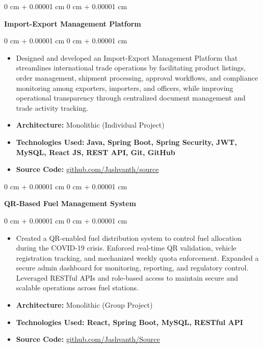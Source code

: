 \documentclass[10pt, letterpaper]{article}
\newenvironment{highlights}{
    \begin{itemize}[
        topsep=0.08 cm,
        parsep=0.08 cm,
        partopsep=0pt,
        itemsep=0pt,
        leftmargin=0 cm + 10pt
    ]
}{
    \end{itemize}
} %
\newenvironment{onecolentry}{
    \begin{adjustwidth}{
        0 cm + 0.00001 cm
    }{
        0 cm + 0.00001 cm
    }
}{
    \end{adjustwidth}
} %
\begin{document}
    \vspace{0.10 cm}

    \begin{onecolentry}
        \textbf{Import-Export Management Platform}
    \end{onecolentry}

    \vspace{0.10 cm}
    \begin{onecolentry}
        \begin{highlights}
            \item Designed and developed an Import-Export Management Platform that streamlines international trade operations by facilitating product listings, order management, shipment processing, approval workflows, and compliance monitoring among exporters, importers, and officers, while improving operational transparency through centralized document management and trade activity tracking.
            \item \textbf{Architecture:} Monolithic (Individual Project)
            \item \textbf{Technologies Used:} \textbf{Java, Spring Boot, Spring Security, JWT, MySQL, React JS, REST API, Git, GitHub}
            \item \textbf{Source Code:} \href{https://github.com/jashvanth370/Import-Export-Products-Project}{github.com/Jashvanth/source}
        \end{highlights}
    \end{onecolentry}

    \vspace{0.10 cm}

    \begin{onecolentry}
        \textbf{QR-Based Fuel Management System}
    \end{onecolentry}
    
    \vspace{0.10 cm}
    \begin{onecolentry}
        \begin{highlights}
            \item Created a QR-enabled fuel distribution system to control fuel allocation during the COVID-19 crisis. Enforced real-time QR validation, vehicle registration tracking, and mechanized weekly quota enforcement. Expanded a secure admin dashboard for monitoring, reporting, and regulatory control. Leveraged RESTful APIs and role-based access to maintain secure and scalable operations across fuel stations.
            \item \textbf{Architecture:} Monolithic (Group Project)
            \item \textbf{Technologies Used: React, Spring Boot, MySQL, RESTful API}
            \item \textbf{Source Code:} \href{https://github.com/Kirisi15/Fuel_Station}{github.com/Jashvanth/Source}
        \end{highlights}
    \end{onecolentry}
\end{document}
